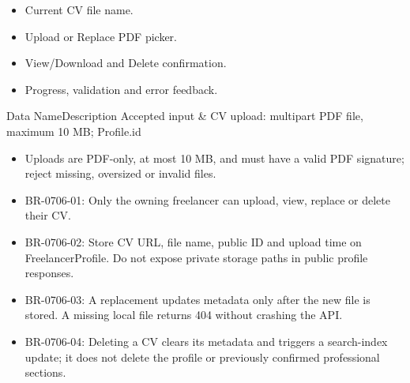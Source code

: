 \begin{itemize}[leftmargin=1.6em,topsep=3pt,itemsep=2pt,parsep=0pt,label=$\bullet$]
    \item Current CV file name.
    \item Upload or Replace PDF picker.
    \item View/Download and Delete confirmation.
    \item Progress, validation and error feedback.
\end{itemize}


\begin{specdatatable}{Data Name}{Description}
Accepted input & CV upload: multipart PDF file, maximum 10 MB; Profile.id\\ \hline
\end{specdatatable}

\begin{itemize}[leftmargin=1.6em,topsep=3pt,itemsep=2pt,parsep=0pt,label=$\bullet$]
    \item Uploads are PDF-only, at most 10 MB, and must have a valid PDF signature; reject missing, oversized or invalid files.
\end{itemize}

\begin{itemize}[leftmargin=1.6em,topsep=3pt,itemsep=2pt,parsep=0pt,label=$\bullet$]\brrulelist
    \item BR-0706-01: Only the owning freelancer can upload, view, replace or delete their CV.
    \item BR-0706-02: Store CV URL, file name, public ID and upload time on FreelancerProfile. Do not expose private storage paths in public profile responses.
    \item BR-0706-03: A replacement updates metadata only after the new file is stored. A missing local file returns 404 without crashing the API.
    \item BR-0706-04: Deleting a CV clears its metadata and triggers a search-index update; it does not delete the profile or previously confirmed professional sections.
\end{itemize}


